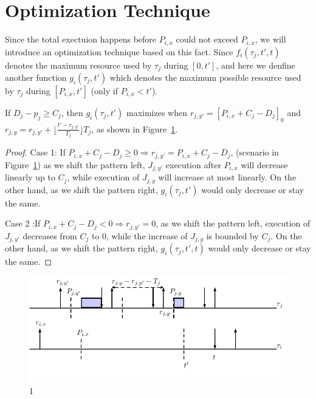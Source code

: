\section{Optimization Technique}
Since the total exectuion happens before $P_{i,x}$ could not exceed $P_{i,x}$, we will introduce an optimization technique based on this fact.  Since  $f_i(\tau_j,t',t)$ denotes the maximum resource used by $\tau_j$ during $[0,t']$, and here we denfine another function $g_i(\tau_j,t')$ which denotes the maximum possible resource used by $\tau_j$ during $[P_{i,x},t']$ (only if $P_{i,x}<t'$).

\begin{lemma}
If $D_j-p_j\geq C_j$, then $g_i(\tau_j,t')$ maximizes when $r_{j,y'}=[P_{i,x}+C_j-D_j]_0$ and  $r_{j,y}=r_{j,y'}+\lfloor \frac{t'-r_{j,y'}}{T_j}\rfloor T_j$, as shown in Figure~\ref{fig:o1}.
\end{lemma}
\begin{proof}
Case 1: If $P_{i,x}+C_j-D_j\geq 0\Rightarrow r_{j,y'}=P_{i,x}+C_j-D_j$, (scenario in Figure~\ref{fig:o1}) as we shift the pattern left, $J_{j,y'}$ execution after $P_{i,x}$ will decrease linearly up to $C_j$, while  execution of $J_{j,y}$  will increase at most linearly. On the other hand, as we shift the pattern right, $g_i(\tau_j,t')$  would only decrease or stay the same.

Case 2 :If $P_{i,x}+C_j-D_j<0\Rightarrow r_{j,y'}=0$, as we shift the pattern left, execution of $J_{j,y'}$ decreases from $C_j$ to 0, while the increase of $J_{j,y}$ is bounded by $C_j$. On the other hand, as we shift the pattern right, $g_i(\tau_j,t',t)$  would only decrease or stay the same.
\end{proof}

\begin{figure}[h!]
 \centering
\includegraphics[scale=0.7]{fig/Cx}  
\caption{1}
  \label{fig:o1}
\end{figure}

